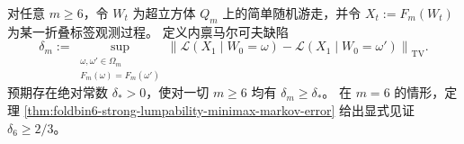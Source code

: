 \begin{conjecture}\label{conj:fold-markovization-defect-universal-lower-bound}
对任意 \(m\ge 6\)，令 \(W_t\) 为超立方体 \(Q_m\) 上的简单随机游走，并令 \(X_t:=F_m(W_t)\) 为某一折叠标签观测过程。
定义内禀马尔可夫缺陷
\[
\delta_m:=
\sup_{\substack{\omega,\omega'\in\Omega_m\\ F_m(\omega)=F_m(\omega')}}
\left\|
\mathcal L(X_1\mid W_0=\omega)-\mathcal L(X_1\mid W_0=\omega')
\right\|_{\mathrm{TV}}.
\]
预期存在绝对常数 \(\delta_\ast>0\)，使对一切 \(m\ge 6\) 均有 \(\delta_m\ge \delta_\ast\)。
在 \(m=6\) 的情形，定理 \ref{thm:foldbin6-strong-lumpability-minimax-markov-error} 给出显式见证 \(\delta_6\ge 2/3\)。
\end{conjecture}

\endinput
